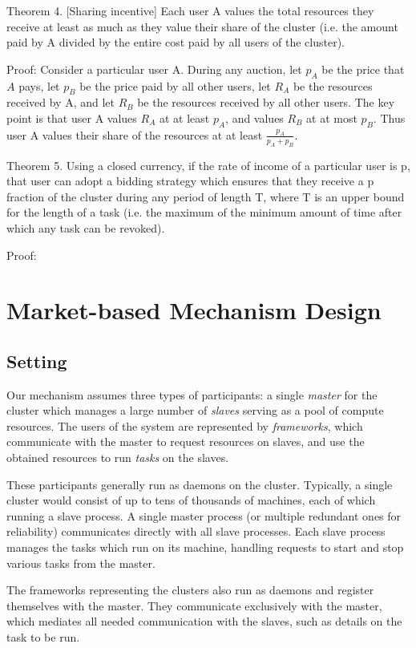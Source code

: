 \documentclass{acm_proc_article-sp}
\begin{document}
Theorem 4. [Sharing incentive] Each user A values the total resources they receive at least as much as they value their share of the cluster (i.e. the amount paid by A divided by the entire cost paid by all users of the cluster).

Proof: Consider a particular user A. During any auction, let $p_A$ be the price that $A$ pays, 
let $p_B$ be the price paid by all other users, let $R_A$ be the resources received by A, and let $R_B$ be the resources received by all other users. The key point is that user A values $R_A$ at at least $p_A$, and values $R_B$ at at most $p_B$. Thus user A values their share of the resources at at least $\frac {p_A}{p_A + p_B}$.


Theorem 5. Using a closed currency, if the rate of income of a particular user is p, that user can adopt a bidding strategy which ensures that they receive a p fraction of the cluster during any period of length T, where T is an upper bound for the length of a task (i.e. the maximum of the minimum amount of time after which any task can be revoked).

Proof: 

\section{Market-based Mechanism Design}
\label{sec:design}
\subsection{Setting}
Our mechanism assumes three types of participants: a single \emph{master} for
the cluster which manages a large number of \emph{slaves} serving as a pool of
compute resources. The users of the system are represented by \emph{frameworks},
which communicate with the master to request resources on slaves, and use the
obtained resources to run \emph{tasks} on the slaves.

These participants generally run as daemons on the cluster.  Typically, a single
cluster would consist of up to tens of thousands of machines, each of which
running a slave process. A single master process (or multiple redundant ones
for reliability) communicates directly with all slave processes.  Each slave
process manages the tasks which run on its machine, handling requests to start
and stop various tasks from the master.

The frameworks representing the clusters also run as daemons and register
themselves with the master. They communicate exclusively with the master, which
mediates all needed communication with the slaves, such as details on the task
to be run.
\end{document}
